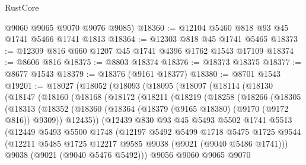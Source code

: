 \begin{lexlean}{RustCore}
\begin{coremodule}
      @9060
      @9065
      @9070
      @9076
      @9085)
@18360 := @12104 @5460 @818 @93 @45 @1741 @5466 @1741 @1813
@18364 := @12303 @818 @45 @1741 @5465
@18373 := @12309 @816 @660 @1207 @45 @1741 @4396 @1762 @1543 @17109
@18374 := @8606 @816
@18375 := @8803 @18374
@18376 := @18373 @18375
@18377 := @8677 @1543
@18379 := @18376 (@9161 @18377)
@18380 := @8701 @1543
@19201 := @18027
    (@18052
      (@18093
        (@18095
          (@18097
            (@18114
              (@18130
                (@18147
                  (@18160
                    (@18168
                      (@18172
                        (@18211
                          (@18219
                            (@18258
                              (@18266
                                (@18305
                                  (@18313
                                    (@18352
                                      (@18360
                                        (@18364 (@18379 (@9165 @18380) (@9170 (@9172 @816)) @9309))
                                        @12435))
                                    (@12439
                                      @830
                                      @93
                                      @45
                                      @5493
                                      @5502
                                      @1741
                                      @5513
                                      (@12449
                                        @5493
                                        @5500
                                        @1748
                                        (@12197
                                          @5492
                                          @5499
                                          @1718
                                          @5475
                                          @1725
                                          @9544
                                          (@12211
                                            @5485
                                            @1725
                                            @12217
                                            @9585
                                            @9038
                                            (@9021 (@9040 @5486 @1741)))
                                          @9038
                                          (@9021 (@9040 @5476 @5492)))
                                        @9056
                                        @9060
                                        @9065
                                        @9070

\end{coremodule}
\end{lexlean}
